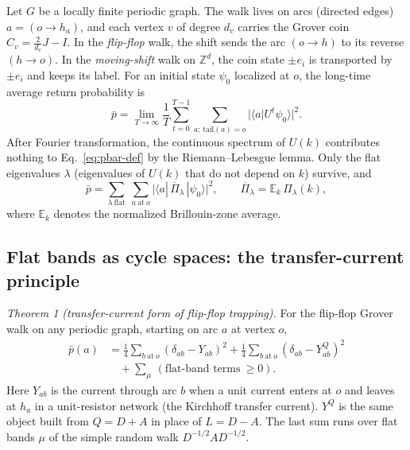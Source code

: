\documentclass[aps,pra,10pt,twocolumn,superscriptaddress,nofootinbib]{revtex4-2}
\newcommand{\E}{\mathbb{E}}
\newcommand{\pbar}{\bar{p}}
\newcommand{\YQ}{Y^{Q}}
\begin{document}
Let $G$ be a locally finite periodic graph. The walk lives on arcs (directed edges)
$a=(o\to h_a)$, and each vertex $v$ of degree $d_v$ carries the Grover coin
$C_v=\tfrac{2}{d_v}J-I$. In the \emph{flip-flop} walk, the shift sends the arc
$(o\to h)$ to its reverse $(h\to o)$. In the \emph{moving-shift} walk on
$\mathbb{Z}^d$, the coin state $\pm e_i$ is transported by $\pm e_i$ and keeps its label.
For an initial state $\psi_0$ localized at $o$, the long-time average return
probability is
\begin{equation}
\pbar=\lim_{T\to\infty}\frac1T\sum_{t=0}^{T-1}\sum_{a:\,\text{tail}(a)=o}
|\langle a|U^t\psi_0\rangle|^2 .
\label{eq:pbar-def}
\end{equation}
After Fourier transformation, the continuous spectrum of $U(k)$ contributes
nothing to Eq.~\eqref{eq:pbar-def} by the Riemann--Lebesgue lemma. Only the flat
eigenvalues $\lambda$ (eigenvalues of $U(k)$ that do not depend on $k$) survive, and
\begin{equation}
\pbar=\sum_{\lambda\ \text{flat}}\ \sum_{a\ \text{at}\ o}
\bigl|\langle a|\,\overline{\Pi}_\lambda\,|\psi_0\rangle\bigr|^2,
\qquad
\overline{\Pi}_\lambda=\E_k\,\Pi_\lambda(k),
\label{eq:pbar-flat}
\end{equation}
where $\E_k$ denotes the normalized Brillouin-zone average.

\subsection{Flat bands as cycle spaces: the transfer-current principle}

\emph{Theorem 1 (transfer-current form of flip-flop trapping).}
For the flip-flop Grover walk on any periodic graph, starting on arc $a$ at vertex $o$,
\begin{align}
\pbar(a)&=\tfrac14\sum_{b\ \text{at}\ o}(\delta_{ab}-Y_{ab})^2
+\tfrac14\sum_{b\ \text{at}\ o}(\delta_{ab}-\YQ_{ab})^2 \nonumber\\
&\quad+\sum_{\mu}\,(\text{flat-band terms}\ \ge 0).
\label{eq:principle}
\end{align}
Here $Y_{ab}$ is the current through arc $b$ when a unit current enters at $o$
and leaves at $h_a$ in a unit-resistor network (the Kirchhoff transfer
current). $\YQ$ is the same object built from $Q=D+A$ in place of $L=D-A$. The
last sum runs over flat bands $\mu$ of the simple random walk $D^{-1/2}AD^{-1/2}$.
\end{document}
